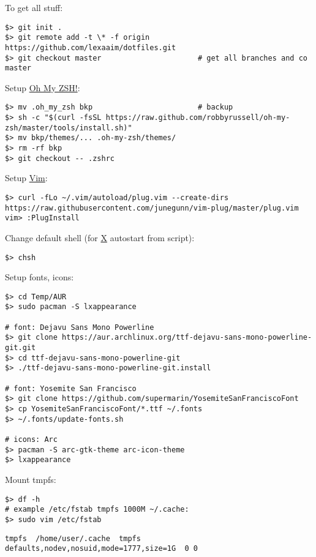\documentclass[a4paper, 12pt]{article}
\begin{document}
To get all stuff:
\begin{lstlisting}
$> git init .
$> git remote add -t \* -f origin https://github.com/lexaaim/dotfiles.git
$> git checkout master                      # get all branches and co master
\end{lstlisting}

Setup \url{Oh My ZSH!}:
\begin{lstlisting}
$> mv .oh_my_zsh bkp                        # backup
$> sh -c "$(curl -fsSL https://raw.github.com/robbyrussell/oh-my-zsh/master/tools/install.sh)"
$> mv bkp/themes/... .oh-my-zsh/themes/
$> rm -rf bkp
$> git checkout -- .zshrc
\end{lstlisting}

Setup \url{Vim}:
\begin{lstlisting}
$> curl -fLo ~/.vim/autoload/plug.vim --create-dirs  https://raw.githubusercontent.com/junegunn/vim-plug/master/plug.vim
vim> :PlugInstall
\end{lstlisting}

Change default shell (for \url{X} autostart from  script):
\begin{lstlisting}
$> chsh
\end{lstlisting}

Setup fonts, icons:
\begin{lstlisting}
$> cd Temp/AUR
$> sudo pacman -S lxappearance

# font: Dejavu Sans Mono Powerline
$> git clone https://aur.archlinux.org/ttf-dejavu-sans-mono-powerline-git.git
$> cd ttf-dejavu-sans-mono-powerline-git
$> ./ttf-dejavu-sans-mono-powerline-git.install

# font: Yosemite San Francisco
$> git clone https://github.com/supermarin/YosemiteSanFranciscoFont
$> cp YosemiteSanFranciscoFont/*.ttf ~/.fonts
$> ~/.fonts/update-fonts.sh

# icons: Arc
$> pacman -S arc-gtk-theme arc-icon-theme
$> lxappearance
\end{lstlisting}

Mount tmpfs:
\begin{lstlisting}
$> df -h
# example /etc/fstab tmpfs 1000M ~/.cache:
$> sudo vim /etc/fstab
\end{lstlisting}

\begin{lstlisting}[style=style_file,caption={/etc/fstab add line:}]
tmpfs  /home/user/.cache  tmpfs  defaults,nodev,nosuid,mode=1777,size=1G  0 0
\end{lstlisting}
\end{document}
